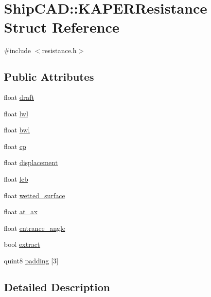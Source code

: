\hypertarget{structShipCAD_1_1KAPERResistance}{\section{Ship\-C\-A\-D\-:\-:K\-A\-P\-E\-R\-Resistance Struct Reference}
\label{structShipCAD_1_1KAPERResistance}
}


{\ttfamily \#include $<$resistance.\-h$>$}

\subsection*{Public Attributes}
\begin{DoxyCompactItemize}
\item 
float \hyperlink{structShipCAD_1_1KAPERResistance_a0be8d3ba3d4e485abe71c462575b478a}{draft}
\item 
float \hyperlink{structShipCAD_1_1KAPERResistance_a1c2aa0aa33bf7770cd531f1d1ea8b809}{lwl}
\item 
float \hyperlink{structShipCAD_1_1KAPERResistance_ab1cc995ebce998cfc19ef8b1501f328e}{bwl}
\item 
float \hyperlink{structShipCAD_1_1KAPERResistance_a07797d6eb31e9a5506f7fca4b92d3f3a}{cp}
\item 
float \hyperlink{structShipCAD_1_1KAPERResistance_a5227818b90eab4991e339bbdf2e382ca}{displacement}
\item 
float \hyperlink{structShipCAD_1_1KAPERResistance_a3b351285dc50665147ce987e0744b314}{lcb}
\item 
float \hyperlink{structShipCAD_1_1KAPERResistance_a912090d77ad755a5b1506372c24540bc}{wetted\-\_\-surface}
\item 
float \hyperlink{structShipCAD_1_1KAPERResistance_a803e780e97a79538c29af4a28c0afd51}{at\-\_\-ax}
\item 
float \hyperlink{structShipCAD_1_1KAPERResistance_a941bc6efce4bc30f542cae5c68218aee}{entrance\-\_\-angle}
\item 
bool \hyperlink{structShipCAD_1_1KAPERResistance_a61ce222b79ad3964b278f5239dd2618f}{extract}
\item 
quint8 \hyperlink{structShipCAD_1_1KAPERResistance_a6ff5b219f299159cf66bc450d2ac2a73}{padding} \mbox{[}3\mbox{]}
\end{DoxyCompactItemize}


\subsection{Detailed Description}


